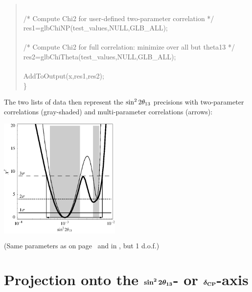 {\begin{quote}
{{ \\
\hspace*{0.5cm} /* Compute Chi2 for user-defined two-parameter correlation */ \\
\hspace*{0.5cm} res1=glbChiNP(test\_values,NULL,GLB\_ALL); \\
      \\
\hspace*{0.5cm} /* Compute Chi2 for full correlation: minimize over all but theta13 */ \\
\hspace*{0.5cm} res2=glbChiTheta(test\_values,NULL,GLB\_ALL); \\
  \\
\hspace*{0.5cm} AddToOutput(x,res1,res2);\\
  \} \\
  
}}
\end{quote}
The two lists of data then represent the $\stheta$ precisions with two-parameter correlations (gray-shaded) and multi-parameter correlations (arrows):
\begin{center}
\colorbox{white}{\includegraphics[width=6cm]{projallex}}

\vspace*{0.1cm}

\footnotesize{(Same parameters as on page~\pageref{ex:corrth13dcp} and in , but 1 d.o.f.)}
\end{center}
}

\section[Projection onto the $\stheta$-axis or $\deltacp$-axis]{Projection onto the $\boldsymbol{\sin^2 2 \theta_{13}}$- or $\boldsymbol{\delta_{\mathrm{CP}}}$-axis}

